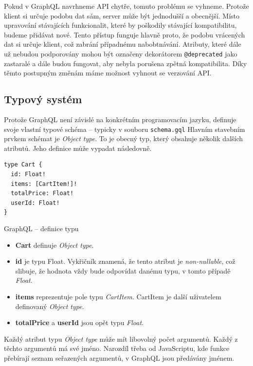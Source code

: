 \documentclass[thesis=M,czech]{FITthesis}[2019/12/23]
\begin{document}
Pokud v GraphQL navrhneme API chytře, tomuto problému se vyhneme. Protože klient si určuje podobu dat sám, server může být jednodušší a obecnější. Místo upravování stávajících funkcionalit, které by poškodily stávající kompatibilitu, budeme přidávat nové. Tento přístup funguje hlavně proto, že podobu vrácených dat si určuje klient, což zabrání případnému nabobtnávání. Atributy, které dále už nebudou podporovány mohou být označeny dekorátorem \texttt{@deprecated} jako zastaralé a dále budou fungovat, aby nebyla porušena zpětná kompatibilita. Díky těmto postupným změnám máme možnost vyhnout se verzování API.

\subsection{Typový systém}
Protože GraphQL není závislé na konkrétním programovacím jazyku, definuje svoje vlastní typové schéma -- typicky v souboru \texttt{schema.gql}
Hlavním stavebním prvkem schémat je \textit{Object type}. To je obecný typ, který obsahuje několik dalších atributů. Jeho definice může vypadat následovně. 

\begin{listing}[H]
\begin{verbatim}
type Cart {
  id: Float!
  items: [CartItem!]!
  totalPrice: Float!
  userId: Float!
}
\end{verbatim}
\caption{GraphQL -- definice typu}
\label{lst:graphql_type}
\end{listing}

\begin{itemize}
    \item \textbf{Cart} definuje \textit{Object type}.
    \item \textbf{id} je typu Float. Vykřičník znamená, že tento atribut je \textit{non-nullable}, což slibuje, že hodnota vždy bude odpovídat danému typu, v tomto případě \textit{Float}.
    \item \textbf{items} reprezentuje pole typu \textit{CartItem}. CartItem je další uživatelem definovaný \textit{Object type}.
    \item \textbf{totalPrice} a \textbf{userId} jsou opět typu \textit{Float}.
\end{itemize}

Každý atribut typu \textit{Object type} může mít libovolný počet argumentů. Každý z těchto argumentů má své jméno. Narozdíl třeba od JavaScriptu, kde funkce přebírají seznam seřazených argumentů, v GraphQL jsou předávány jménem.
\end{document}
